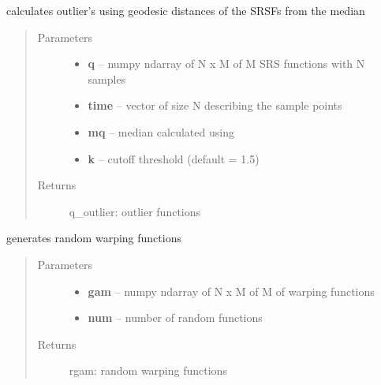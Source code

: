 \documentclass[letterpaper,10pt,english]{sphinxmanual}
\begin{document}
\begin{fulllineitems}
\label{utility_functions:utility_functions.outlier_detection}
calculates outlier's using geodesic distances of the SRSFs from the median
\begin{quote}\begin{description}
\item[{Parameters}] \leavevmode\begin{itemize}
\item {} 
\textbf{q} -- numpy ndarray of N x M of M SRS functions with N samples

\item {} 
\textbf{time} -- vector of size N describing the sample points

\item {} 
\textbf{mq} -- median calculated using {\hyperref[time_warping:time_warping.srsf_align]{}}

\item {} 
\textbf{k} -- cutoff threshold (default = 1.5)

\end{itemize}

\item[{Returns}] \leavevmode
q\_outlier: outlier functions

\end{description}\end{quote}

\end{fulllineitems}


\begin{fulllineitems}
\label{utility_functions:utility_functions.randomGamma}
generates random warping functions
\begin{quote}\begin{description}
\item[{Parameters}] \leavevmode\begin{itemize}
\item {} 
\textbf{gam} -- numpy ndarray of N x M of M of warping functions

\item {} 
\textbf{num} -- number of random functions

\end{itemize}

\item[{Returns}] \leavevmode
rgam: random warping functions

\end{description}\end{quote}

\end{fulllineitems}
\end{document}
